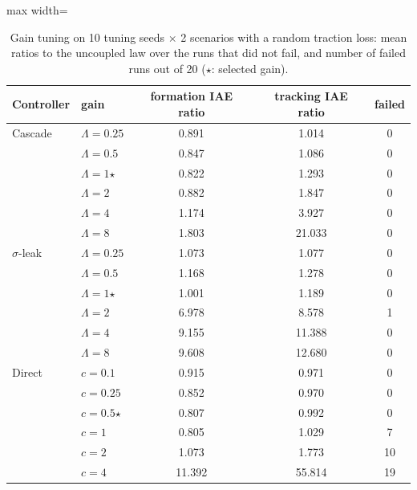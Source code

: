 \begin{table}[htbp]\centering\small
\caption{Gain tuning on 10 tuning seeds $\times$ 2 scenarios with a random traction loss: mean ratios to the uncoupled law over the runs that did not fail, and number of failed runs out of 20 ($\star$: selected gain).}\label{tab:r0}
\begin{adjustbox}{max width=\linewidth}
\begin{tabular}{@{}llccc@{}}\toprule
Controller & gain & formation IAE ratio & tracking IAE ratio & failed\\\midrule
Cascade & $\Lambda=0.25$ & 0.891 & 1.014 & 0\\
 & $\Lambda=0.5$ & 0.847 & 1.086 & 0\\
 & $\Lambda=1$$\star$ & 0.822 & 1.293 & 0\\
 & $\Lambda=2$ & 0.882 & 1.847 & 0\\
 & $\Lambda=4$ & 1.174 & 3.927 & 0\\
 & $\Lambda=8$ & 1.803 & 21.033 & 0\\
\addlinespace
$\sigma$-leak & $\Lambda=0.25$ & 1.073 & 1.077 & 0\\
 & $\Lambda=0.5$ & 1.168 & 1.278 & 0\\
 & $\Lambda=1$$\star$ & 1.001 & 1.189 & 0\\
 & $\Lambda=2$ & 6.978 & 8.578 & 1\\
 & $\Lambda=4$ & 9.155 & 11.388 & 0\\
 & $\Lambda=8$ & 9.608 & 12.680 & 0\\
\addlinespace
Direct & $c=0.1$ & 0.915 & 0.971 & 0\\
 & $c=0.25$ & 0.852 & 0.970 & 0\\
 & $c=0.5$$\star$ & 0.807 & 0.992 & 0\\
 & $c=1$ & 0.805 & 1.029 & 7\\
 & $c=2$ & 1.073 & 1.773 & 10\\
 & $c=4$ & 11.392 & 55.814 & 19\\
\bottomrule\end{tabular}
\end{adjustbox}
\end{table}
